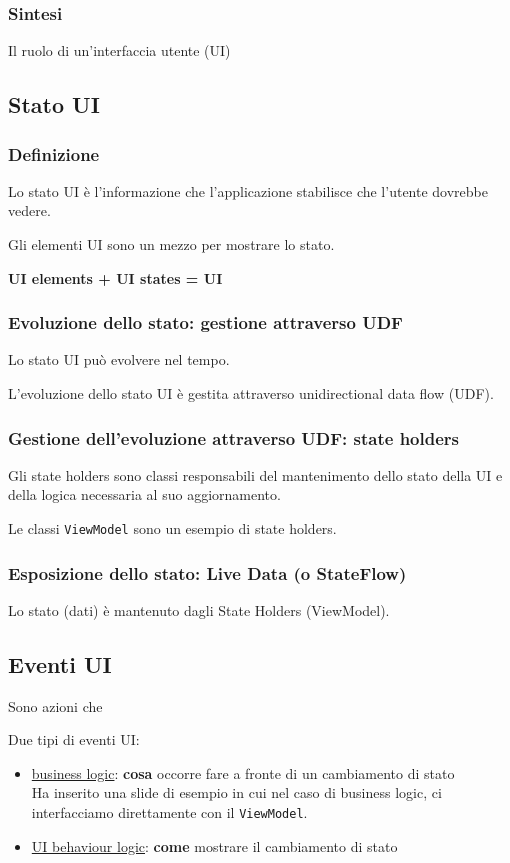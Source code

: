 \subsubsection{Sintesi}
\par Il ruolo di un'interfaccia utente (UI) %

\subsection{Stato UI}
\subsubsection{Definizione}
\par Lo stato UI è l'informazione che l'applicazione stabilisce che l'utente dovrebbe vedere.
\par Gli elementi UI sono un mezzo per mostrare lo stato.
\par \textbf{UI elements + UI states = UI}

\subsubsection{Evoluzione dello stato: gestione attraverso UDF}
\par Lo stato UI può evolvere nel tempo.
\par L'evoluzione dello stato UI è gestita attraverso unidirectional data flow (UDF).

\subsubsection{Gestione dell'evoluzione attraverso UDF: state holders}
\par Gli state holders sono classi responsabili del mantenimento dello stato della UI e della logica necessaria al suo aggiornamento.
\par Le classi \texttt{ViewModel} sono un esempio di state holders.

\subsubsection{Esposizione dello stato: Live Data (o StateFlow)}
\par Lo stato (dati) è mantenuto dagli State Holders (ViewModel).

\subsection{Eventi UI}
\par Sono azioni che %
\par Due tipi di eventi UI:
\begin{itemize}
    \item \underline{business logic}: \textbf{cosa} occorre fare a fronte di un cambiamento di stato\\
    Ha inserito una slide di esempio in cui nel caso di business logic, ci interfacciamo direttamente con il \texttt{ViewModel}.
    \item \underline{UI behaviour logic}: \textbf{come} mostrare il cambiamento di stato
\end{itemize}

